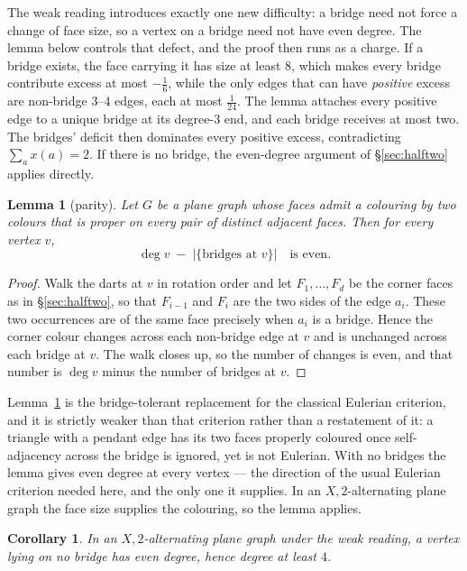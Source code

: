 \documentclass{baustms}
\theoremstyle{cupthm}
\newtheorem{lemma}[theorem]{Lemma}
\newtheorem{corollary}[theorem]{Corollary}
\theoremstyle{cupdefn}
\theoremstyle{cuprem}
\begin{document}
The weak reading introduces exactly one new difficulty: a bridge need not force
a change of face size, so a vertex on a bridge need not have even degree. The
lemma below controls that defect, and the proof then runs as a charge. If a
bridge exists, the face carrying it has size at least $8$, which makes every
bridge contribute excess at most $-\tfrac16$, while the only edges that can have
\emph{positive} excess are non-bridge $3$--$4$ edges, each at most
$\tfrac1{24}$. The lemma attaches every positive edge to a unique bridge at its
degree-$3$ end, and each bridge receives at most two. The bridges' deficit then
dominates every positive excess, contradicting $\sum_a x(a) = 2$. If there is no
bridge, the even-degree argument of \S\ref{sec:halftwo} applies directly.

\begin{lemma}[parity]\label{lem:parity}
Let $G$ be a plane graph whose faces admit a colouring by two colours that is
proper on every pair of distinct adjacent faces. Then for every vertex $v$,
\[
  \deg v \;-\; \bigl|\{\text{bridges at } v\}\bigr| \quad\text{is even.}
\]
\end{lemma}

\begin{proof}
Walk the darts at $v$ in rotation order and let $F_1,\dots,F_d$ be the corner
faces as in \S\ref{sec:halftwo}, so that $F_{i-1}$ and $F_i$ are the two sides
of the edge $a_i$. These two occurrences are of the same face precisely when
$a_i$ is a bridge. Hence the corner colour changes across each non-bridge edge
at $v$ and is unchanged across each bridge at $v$. The walk closes up, so the
number of changes is even, and that number is $\deg v$ minus the number of
bridges at $v$.
\end{proof}

Lemma~\ref{lem:parity} is the bridge-tolerant replacement for the classical
Eulerian criterion, and it is strictly weaker than that criterion rather than a
restatement of it: a triangle with a pendant edge has its two faces properly
coloured once self-adjacency across the bridge is ignored, yet is not Eulerian.
With no bridges the lemma gives even degree at every vertex --- the direction
of the usual Eulerian criterion needed here, and the only one it supplies. In an $X,2$-alternating plane graph the face
size supplies the colouring, so the lemma applies.

\begin{corollary}\label{cor:evendeg}
In an $X,2$-alternating plane graph under the weak reading, a vertex lying on no
bridge has even degree, hence degree at least $4$.
\end{corollary}
\end{document}
